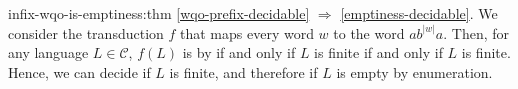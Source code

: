 \begin{proofof}{infix-wqo-is-emptiness:thm}
    \cref{wqo-prefix-decidable} $\Rightarrow$
    \cref{emptiness-decidable}. We consider the transduction $f$ that 
    maps every word $w$ to the word $a b^{|w|} a$.
    Then, for any language $L \in \mathcal C$, $f(L)$ is 
    by  if and only if $L$ is finite if and only if $L$ is finite.
    Hence, we can decide if $L$ is finite, and therefore if $L$ is empty 
    by enumeration.
\end{proofof}
